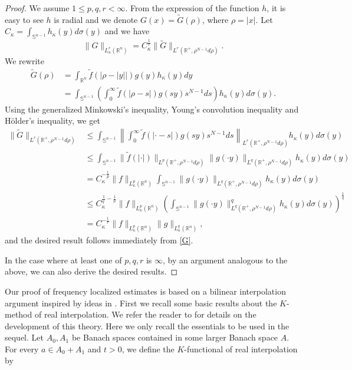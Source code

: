 \documentclass[a4paper,11pt, reqno]{amsart}
\numberwithin{equation}{section}
\theoremstyle{plain}
\theoremstyle{definition}
\theoremstyle{remark}
\begin{document}
\begin{proof} We assume $1\leq p,q,r<\infty$. From the expression of the function $h$, it is easy to see $h$ is radial and we denote $G(x)=\widetilde{G}(\rho)$, where $\rho=|x|$. Let $C_\kappa=\int_{\mathbb{S}^{n-1}}h_\kappa(y)d\sigma(y)$ and we have 
\begin{equation}\label{G}
\|G\|_{L_\kappa^r(\mathbb{R}^n)}=C_\kappa^\frac{1}{r}\|\widetilde{G}\|_{L^r(\mathbb{R}^+,\rho^{N-1}d\rho)}.
\end{equation}
We rewrite 
\begin{align*}
\widetilde{G}(\rho)&=\int_{\mathbb{R}^n}\tilde{f}\left(\big|\rho-|y|\big|\right) g(y)h_\kappa(y)dy\\
&=\int_{\mathbb{S}^{n-1}}\left(\int_0^\infty \tilde{f}\left(|\rho-s|\right) g(sy)s^{N-1}ds\right)h_\kappa(y)d\sigma(y).
\end{align*}
Using the generalized Minkowski's inequality, Young's convolution inequality and H\"older's inequality, we get
\begin{align*}
\|\widetilde{G}\|_{L^r(\mathbb{R}^+,\rho^{N-1}d\rho)}&\leq\int_{\mathbb{S}^{n-1}}\left\|\int_0^\infty \tilde{f}\left(|\cdot-s|\right) g(sy)s^{N-1}ds\right\|_{L^r(\mathbb{R}^+,\rho^{N-1}d\rho)}h_\kappa(y)d\sigma(y)\\
&\leq\int_{\mathbb{S}^{n-1}}\|\tilde{f}(|\cdot|)\|_{L^p(\mathbb{R}^+,\rho^{N-1}d\rho)}\|g(\cdot y)\|_{L^q(\mathbb{R}^+,\rho^{N-1}d\rho)}h_\kappa(y)d\sigma(y)\\ 
&=C_\kappa^{-\frac{1}{p}}\|f\|_{L_\kappa^p(\mathbb{R}^n)}\int_{\mathbb{S}^{n-1}}\|g(\cdot y)\|_{L^q(\mathbb{R}^+,\rho^{N-1}d\rho)}h_\kappa(y)d\sigma(y)\\ 
&\leq C_\kappa^{\frac{1}{q^\prime}-\frac{1}{p}}\|f\|_{L_\kappa^p(\mathbb{R}^n)}\left(\int_{\mathbb{S}^{n-1}}\|g(\cdot y)\|^q_{L^q(\mathbb{R}^+,\rho^{N-1}d\rho)}h_\kappa(y)d\sigma(y)\right)^\frac{1}{q}\\
&= C_\kappa^{-\frac{1}{r}}\|f\|_{L_\kappa^p(\mathbb{R}^n)}\|g\|_{L_\kappa^q(\mathbb{R}^n)},
\end{align*}
and the desired result follows immediately from \eqref{G}.

In the case where at least one of $p,q,r$ is $\infty$, by an argument analogous to the above, we can also derive the desired results.
\end{proof}
Our proof of frequency localized estimates is based on a bilinear interpolation argument inspired by ideas in \cite{KT}. First we recall some basic results about the $K$-method of real interpolation. We refer the reader to \cite{Bennett, Bergh-Lofstrom} for details on the development of this theory. Here we only recall the essentials to be used in the sequel. Let $A_0, A_1$ be Banach spaces contained in some larger Banach space $A$. For every $a\in A_0+A_1$ and $t>0$, we define the $K$-functional of real interpolation by
\end{document}
